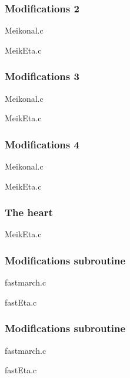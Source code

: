 \begin{frame} \frametitle{Modifications 2}

\normalsize 

		{Meikonal.c}

		{MeikEta.c}
		
\end{frame}
\cwpnote{}

\begin{frame} \frametitle{Modifications 3}

\normalsize 

		{Meikonal.c}

		{MeikEta.c}
		
\end{frame}
\cwpnote{}

\begin{frame} \frametitle{Modifications 4}

\normalsize 

		{Meikonal.c}

		{MeikEta.c}
		
\end{frame}
\cwpnote{}

\begin{frame} \frametitle{The heart}


		{MeikEta.c}
		
\end{frame}
\cwpnote{}

\begin{frame} \frametitle{Modifications subroutine}

\normalsize 

		{fastmarch.c}

		{fastEta.c}
		
\end{frame}
\cwpnote{}

\begin{frame} \frametitle{Modifications subroutine}

\normalsize 

		{fastmarch.c}

		{fastEta.c}
		
\end{frame}
\cwpnote{}

